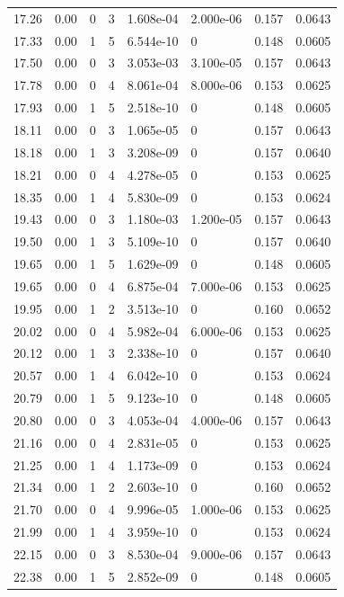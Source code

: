 \documentclass[preview]{standalone}
\begin{document}
{{{\begin{tabular}{L{1.2cm}C{1.2cm} C{0.3cm}C{0.5cm} C{1.4cm}C{1.4cm} C{1.4cm}C{1.4cm}}
  17.26  &  0.00  & 0     &  3 &  1.608e-04  & 2.000e-06  & 0.157 &  0.0643   \\ 
  17.33  &  0.00  & 1     &  5 &  6.544e-10  & 0  & 0.148 &  0.0605   \\ 
  17.50  &  0.00  & 0     &  3 &  3.053e-03  & 3.100e-05  & 0.157 &  0.0643   \\ 
  17.78  &  0.00  & 0     &  4 &  8.061e-04  & 8.000e-06  & 0.153 &  0.0625   \\ 
  17.93  &  0.00  & 1     &  5 &  2.518e-10  & 0  & 0.148 &  0.0605   \\ 
  18.11  &  0.00  & 0     &  3 &  1.065e-05  & 0  & 0.157 &  0.0643   \\ 
  18.18  &  0.00  & 1     &  3 &  3.208e-09  & 0  & 0.157 &  0.0640   \\ 
  18.21  &  0.00  & 0     &  4 &  4.278e-05  & 0  & 0.153 &  0.0625   \\ 
  18.35  &  0.00  & 1     &  4 &  5.830e-09  & 0  & 0.153 &  0.0624   \\ 
  19.43  &  0.00  & 0     &  3 &  1.180e-03  & 1.200e-05  & 0.157 &  0.0643   \\ 
  19.50  &  0.00  & 1     &  3 &  5.109e-10  & 0  & 0.157 &  0.0640   \\ 
  19.65  &  0.00  & 1     &  5 &  1.629e-09  & 0  & 0.148 &  0.0605   \\ 
  19.65  &  0.00  & 0     &  4 &  6.875e-04  & 7.000e-06  & 0.153 &  0.0625   \\ 
  19.95  &  0.00  & 1     &  2 &  3.513e-10  & 0  & 0.160 &  0.0652   \\ 
  20.02  &  0.00  & 0     &  4 &  5.982e-04  & 6.000e-06  & 0.153 &  0.0625   \\ 
  20.12  &  0.00  & 1     &  3 &  2.338e-10  & 0  & 0.157 &  0.0640   \\ 
  20.57  &  0.00  & 1     &  4 &  6.042e-10  & 0  & 0.153 &  0.0624   \\ 
  20.79  &  0.00  & 1     &  5 &  9.123e-10  & 0  & 0.148 &  0.0605   \\ 
  20.80  &  0.00  & 0     &  3 &  4.053e-04  & 4.000e-06  & 0.157 &  0.0643   \\ 
  21.16  &  0.00  & 0     &  4 &  2.831e-05  & 0  & 0.153 &  0.0625   \\ 
  21.25  &  0.00  & 1     &  4 &  1.173e-09  & 0  & 0.153 &  0.0624   \\ 
  21.34  &  0.00  & 1     &  2 &  2.603e-10  & 0  & 0.160 &  0.0652   \\ 
  21.70  &  0.00  & 0     &  4 &  9.996e-05  & 1.000e-06  & 0.153 &  0.0625   \\ 
  21.99  &  0.00  & 1     &  4 &  3.959e-10  & 0  & 0.153 &  0.0624   \\ 
  22.15  &  0.00  & 0     &  3 &  8.530e-04  & 9.000e-06  & 0.157 &  0.0643   \\ 
  22.38  &  0.00  & 1     &  5 &  2.852e-09  & 0  & 0.148 &  0.0605   \\ 
\hline 
\end{tabular} 

}}}
\end{document}
